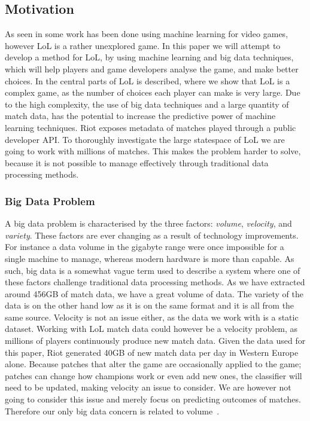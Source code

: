 \subsection{Motivation}\label{sec:motivation}
As seen in  some work has been done using machine learning for video games, however LoL is a rather unexplored game. 
In this paper we will attempt to develop a method for LoL, by using machine learning and big data techniques, which will help players and game developers analyse the game, and make better choices. In  the central parts of LoL is described, where we show that LoL is a complex game, as the number of choices each player can make is very large. Due to the high complexity, the use of big data techniques and a large quantity of match data, has the potential to increase the predictive power of machine learning techniques. Riot exposes metadata of matches played through a public developer API. To thoroughly investigate the large statespace of LoL we are going to work with millions of matches. This makes the problem harder to solve, because it is not possible to manage effectively through traditional data processing methods.

\subsubsection{Big Data Problem}\label{sec:big_data_problem}
A big data problem is characterised by the three factors: \emph{volume}, \emph{velocity}, and \emph{variety}. These factors are ever changing as a result of technology improvements. For instance a data volume in the gigabyte range were once impossible for a single machine to manage, whereas modern hardware is more than capable. As such, big data is a somewhat vague term used to describe a system where one of these factors challenge traditional data processing methods. As we have extracted around 456GB of match data, we have a great volume of data. The variety of the data is on the other hand low as it is on the same format and it is all from the same source. Velocity is not an issue either, as the data we work with is a static dataset. Working with LoL match data could however be a velocity problem, as millions of players continuously produce new match data. Given the data used for this paper, Riot generated 40GB of new match data per day in Western Europe alone. Because patches that alter the game are occasionally applied to the game; patches can change how champions work or even add new ones, the classifier will need to be updated, making velocity an issue to consider. We are however not going to consider this issue and merely focus on predicting outcomes of matches. Therefore our only big data concern is related to volume~\cite{madden2012databases}.

